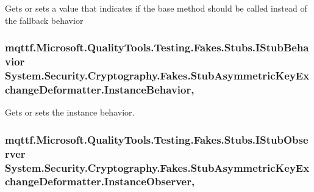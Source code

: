 Gets or sets a value that indicates if the base method should be called instead of the fallback behavior

\hypertarget{class_system_1_1_security_1_1_cryptography_1_1_fakes_1_1_stub_asymmetric_key_exchange_deformatter_a866043a72e5d7f48b24840dc50d9bf8d}{
\subsubsection[{Instance\-Behavior}]{\setlength{\rightskip}{0pt plus 5cm}mqttf.\-Microsoft.\-Quality\-Tools.\-Testing.\-Fakes.\-Stubs.\-I\-Stub\-Behavior System.\-Security.\-Cryptography.\-Fakes.\-Stub\-Asymmetric\-Key\-Exchange\-Deformatter.\-Instance\-Behavior\hspace{0.3cm}{\ttfamily [get]}, {\ttfamily [set]}}}\label{class_system_1_1_security_1_1_cryptography_1_1_fakes_1_1_stub_asymmetric_key_exchange_deformatter_a866043a72e5d7f48b24840dc50d9bf8d}


Gets or sets the instance behavior.

\hypertarget{class_system_1_1_security_1_1_cryptography_1_1_fakes_1_1_stub_asymmetric_key_exchange_deformatter_a140d067e6e4149a58a02611a97c70f23}{
\subsubsection[{Instance\-Observer}]{\setlength{\rightskip}{0pt plus 5cm}mqttf.\-Microsoft.\-Quality\-Tools.\-Testing.\-Fakes.\-Stubs.\-I\-Stub\-Observer System.\-Security.\-Cryptography.\-Fakes.\-Stub\-Asymmetric\-Key\-Exchange\-Deformatter.\-Instance\-Observer\hspace{0.3cm}{\ttfamily [get]}, {\ttfamily [set]}}}\label{class_system_1_1_security_1_1_cryptography_1_1_fakes_1_1_stub_asymmetric_key_exchange_deformatter_a140d067e6e4149a58a02611a97c70f23}


